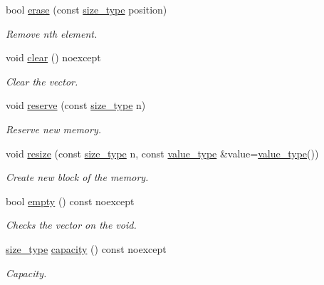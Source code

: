 \begin{DoxyCompactItemize}
bool \hyperlink{classatom_1_1vector__t_ab414b36ee5235f86352dbdb73ff6c0e0}{erase} (const \hyperlink{classatom_1_1vector__t_a1790d79321f4fa8d2580474dd0f56033}{size\+\_\+type} position)
\begin{DoxyCompactList}\small\item\em Remove nth element. \end{DoxyCompactList}\item 
\mbox{\label{classatom_1_1vector__t_a6a6e6950a03b50dd330c2b54f8a6104a}} 
void \hyperlink{classatom_1_1vector__t_a6a6e6950a03b50dd330c2b54f8a6104a}{clear} () noexcept
\begin{DoxyCompactList}\small\item\em Clear the vector. \end{DoxyCompactList}\item 
void \hyperlink{classatom_1_1vector__t_a76f6cab17dbffe1a54657199b6a5cb55}{reserve} (const \hyperlink{classatom_1_1vector__t_a1790d79321f4fa8d2580474dd0f56033}{size\+\_\+type} n)
\begin{DoxyCompactList}\small\item\em Reserve new memory. \end{DoxyCompactList}\item 
void \hyperlink{classatom_1_1vector__t_a5720e4e26657a55697d4335663cb6f10}{resize} (const \hyperlink{classatom_1_1vector__t_a1790d79321f4fa8d2580474dd0f56033}{size\+\_\+type} n, const \hyperlink{classatom_1_1vector__t_a558283a4fed53856d445ceb61ac96d94}{value\+\_\+type} \&value=\hyperlink{classatom_1_1vector__t_a558283a4fed53856d445ceb61ac96d94}{value\+\_\+type}())
\begin{DoxyCompactList}\small\item\em Create new block of the memory. \end{DoxyCompactList}\item 
bool \hyperlink{classatom_1_1vector__t_a0204758afeafe695689a8c926fa79897}{empty} () const noexcept
\begin{DoxyCompactList}\small\item\em Checks the vector on the void. \end{DoxyCompactList}\item 
\hyperlink{classatom_1_1vector__t_a1790d79321f4fa8d2580474dd0f56033}{size\+\_\+type} \hyperlink{classatom_1_1vector__t_ada6d9f1b78bbb338980c4bd714cd3096}{capacity} () const noexcept
\begin{DoxyCompactList}\small\item\em Capacity. \end{DoxyCompactList}\item 

\end{DoxyCompactItemize}
